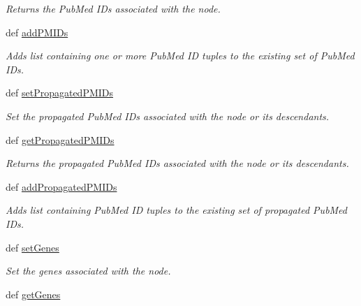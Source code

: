 \begin{DoxyCompactItemize}
\begin{DoxyCompactList}\small\item\em Returns the Pub\-Med I\-Ds associated with the node. \end{DoxyCompactList}\item 
def \hyperlink{classgographer_1_1_g_o_node_1_1_g_o_node_a74974a9de346f4fc20c706be06d942ef}{add\-P\-M\-I\-Ds}
\begin{DoxyCompactList}\small\item\em Adds list containing one or more Pub\-Med I\-D tuples to the existing set of Pub\-Med I\-Ds. \end{DoxyCompactList}\item 
def \hyperlink{classgographer_1_1_g_o_node_1_1_g_o_node_a4cb9c3ea2f23af472e15cfc53602cfb8}{set\-Propagated\-P\-M\-I\-Ds}
\begin{DoxyCompactList}\small\item\em Set the propagated Pub\-Med I\-Ds associated with the node or its descendants. \end{DoxyCompactList}\item 
\hypertarget{classgographer_1_1_g_o_node_1_1_g_o_node_ade1c13780ac26daec9341a9db6be26dc}{def \hyperlink{classgographer_1_1_g_o_node_1_1_g_o_node_ade1c13780ac26daec9341a9db6be26dc}{get\-Propagated\-P\-M\-I\-Ds}}\label{classgographer_1_1_g_o_node_1_1_g_o_node_ade1c13780ac26daec9341a9db6be26dc}

\begin{DoxyCompactList}\small\item\em Returns the propagated Pub\-Med I\-Ds associated with the node or its descendants. \end{DoxyCompactList}\item 
def \hyperlink{classgographer_1_1_g_o_node_1_1_g_o_node_ac393afb81160458d096b41f6837e981e}{add\-Propagated\-P\-M\-I\-Ds}
\begin{DoxyCompactList}\small\item\em Adds list containing Pub\-Med I\-D tuples to the existing set of propagated Pub\-Med I\-Ds. \end{DoxyCompactList}\item 
def \hyperlink{classgographer_1_1_g_o_node_1_1_g_o_node_a8085440f2f60e68acc0d436030642671}{set\-Genes}
\begin{DoxyCompactList}\small\item\em Set the genes associated with the node. \end{DoxyCompactList}\item 
\hypertarget{classgographer_1_1_g_o_node_1_1_g_o_node_a1d056c7237ce4d4919d0ad5f5ed4e385}{def \hyperlink{classgographer_1_1_g_o_node_1_1_g_o_node_a1d056c7237ce4d4919d0ad5f5ed4e385}{get\-Genes}}\label{classgographer_1_1_g_o_node_1_1_g_o_node_a1d056c7237ce4d4919d0ad5f5ed4e385}


\end{DoxyCompactItemize}
